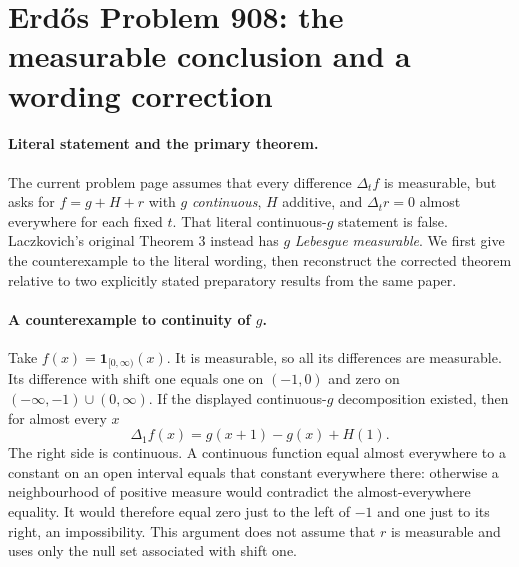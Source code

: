 \section*{Erd\H{o}s Problem 908: the measurable conclusion and a wording correction}

\paragraph{Literal statement and the primary theorem.}
The current problem page assumes that every difference
\(\Delta_t f\) is measurable, but asks for
\(f=g+H+r\) with \(g\) \emph{continuous}, \(H\) additive,
and \(\Delta_t r=0\) almost everywhere for each fixed \(t\).
That literal continuous-\(g\) statement is false.
Laczkovich's original Theorem 3 instead has \(g\)
\emph{Lebesgue measurable}. We first give the counterexample
to the literal wording, then reconstruct the corrected
theorem relative to two explicitly stated preparatory
results from the same paper.

\paragraph{A counterexample to continuity of \(g\).}
Take \(f(x)=\mathbf1_{[0,\infty)}(x)\). It is measurable,
so all its differences are measurable.
Its difference with shift one equals one on \((-1,0)\)
and zero on \((-\infty,-1)\cup(0,\infty)\).
If the displayed continuous-\(g\) decomposition existed,
then for almost every \(x\)
\[
 \Delta_1 f(x)=g(x+1)-g(x)+H(1).
\]
The right side is continuous. A continuous function
equal almost everywhere to a constant on an open
interval equals that constant everywhere there:
otherwise a neighbourhood of positive measure
would contradict the almost-everywhere equality.
It would therefore equal zero just to the left of
\(-1\) and one just to its right, an impossibility.
This argument does not assume that \(r\) is measurable
and uses only the null set associated with shift one.

